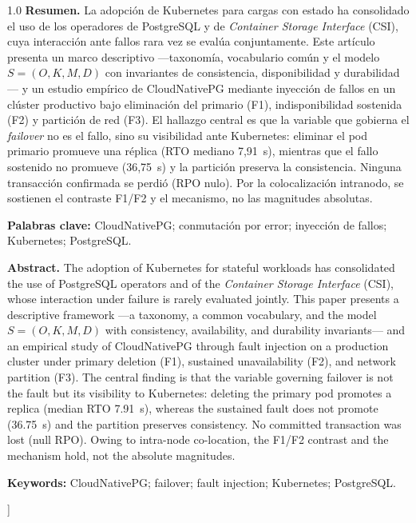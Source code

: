 \documentclass[12pt,twocolumn,letterpaper]{article}
\begin{document}
{\begin{@twocolumnfalse}
\vspace{1em}
\begin{spacing}{1.0}
\noindent\textbf{Resumen.}\; \small\justifying
La adopción de Kubernetes para cargas con estado ha consolidado el uso de los operadores de PostgreSQL y de \textit{Container Storage Interface} (CSI), cuya interacción ante fallos rara vez se evalúa conjuntamente. Este artículo presenta un marco descriptivo —taxonomía, vocabulario común y el modelo $S=(O,K,M,D)$ con invariantes de consistencia, disponibilidad y durabilidad— y un estudio empírico de CloudNativePG mediante inyección de fallos en un clúster productivo bajo eliminación del primario (F1), indisponibilidad sostenida (F2) y partición de red (F3). El hallazgo central es que la variable que gobierna el \textit{failover} no es el fallo, sino su visibilidad ante Kubernetes: eliminar el pod primario promueve una réplica (RTO mediano 7,91~s), mientras que el fallo sostenido no promueve (36,75~s) y la partición preserva la consistencia. Ninguna transacción confirmada se perdió (RPO nulo). Por la colocalización intranodo, se sostienen el contraste F1/F2 y el mecanismo, no las magnitudes absolutas.
\par\vspace{0.5em}
\noindent\textbf{\small Palabras clave:}\; {\small CloudNativePG; conmutación por error; inyección de fallos; Kubernetes; PostgreSQL.}
\par\vspace{0.8em}
\noindent\textbf{Abstract.}\; \small\justifying
The adoption of Kubernetes for stateful workloads has consolidated the use of PostgreSQL operators and of the \textit{Container Storage Interface} (CSI), whose interaction under failure is rarely evaluated jointly. This paper presents a descriptive framework —a taxonomy, a common vocabulary, and the model $S=(O,K,M,D)$ with consistency, availability, and durability invariants— and an empirical study of CloudNativePG through fault injection on a production cluster under primary deletion (F1), sustained unavailability (F2), and network partition (F3). The central finding is that the variable governing failover is not the fault but its visibility to Kubernetes: deleting the primary pod promotes a replica (median RTO 7.91~s), whereas the sustained fault does not promote (36.75~s) and the partition preserves consistency. No committed transaction was lost (null RPO). Owing to intra-node co-location, the F1/F2 contrast and the mechanism hold, not the absolute magnitudes.
\par\vspace{0.5em}
\noindent\textbf{\small Keywords:}\; {\small CloudNativePG; failover; fault injection; Kubernetes; PostgreSQL.}
\end{spacing}
\vspace{1.4em}
\end{@twocolumnfalse}
}]
\end{document}
